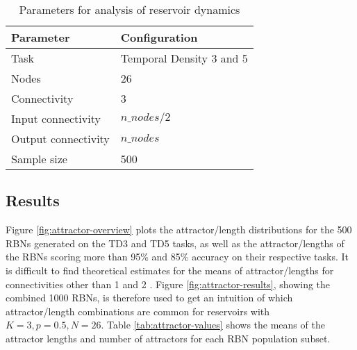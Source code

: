 \begin{table}[ht]
    \centering
    \caption{Parameters for analysis of reservoir dynamics}
    \label{tab:reservoir-dynamics-parameters}
    \begin{tabular}{ll}
        \hline
        \textbf{Parameter} & \textbf{Configuration} \\
        \hline
        \hline
        Task                & Temporal Density 3 and 5  \\
        Nodes               & 26                        \\
        Connectivity        & 3                         \\
        Input connectivity  & $ n\_nodes / 2 $          \\
        Output connectivity & $ n\_nodes $              \\
        Sample size         & 500 \\
        \hline
    \end{tabular}
\end{table}

\subsection{Results}

Figure \ref{fig:attractor-overview} plots the attractor/length distributions for the 500 RBNs generated on the TD3 and TD5 tasks,
as well as the attractor/lengths of the RBNs scoring more than 95\% and 85\% accuracy on their respective tasks.
It is difficult to find theoretical estimates for the means of attractor/lengths for connectivities other than 1 \cite{drossel2005number} and 2 \cite{samuelsson2003superpolynomial}.
Figure \ref{fig:attractor-results}, showing the combined 1000 RBNs, is therefore used to get an intuition of which attractor/length combinations are common for reservoirs with $ K=3, p=0.5, N=26 $.
Table \ref{tab:attractor-values} shows the means of the attractor lengths and number of attractors for each RBN population subset.

